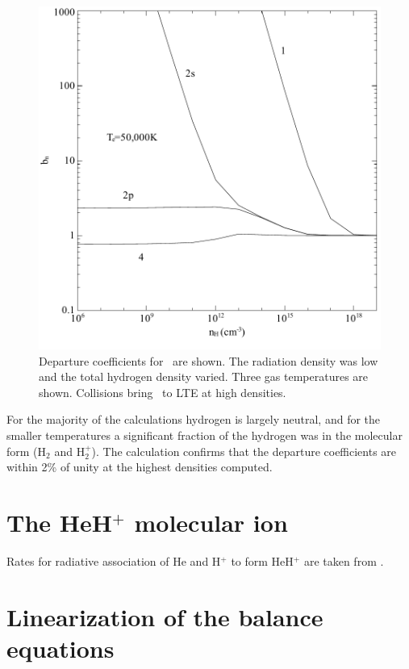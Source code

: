 \begin{figure}
\centering
\includegraphics[scale=0.8]{Hmi_vs_density}
\caption[\protect\hminus\ departure coefficients vs density]{Departure coefficients for \hminus\ are shown. The radiation density
was low and the total hydrogen density varied.  Three gas temperatures are
shown.  Collisions bring \hminus\ to LTE at high densities.}
\label{fig:Hmi_vs_density}
\end{figure}

For the majority of the calculations hydrogen is largely neutral, and
for the smaller temperatures a significant fraction of the hydrogen was
in the molecular form (H$_2$ and H$_2^+$).  The calculation confirms that the
departure coefficients are within 2\% of unity at the highest densities
computed.

\section{The HeH$^+$ molecular ion }

Rates for radiative association of He and H$^+$ to form HeH$^+$ are taken from \citet{Zygelman1990}.

\section{Linearization of the balance equations}

